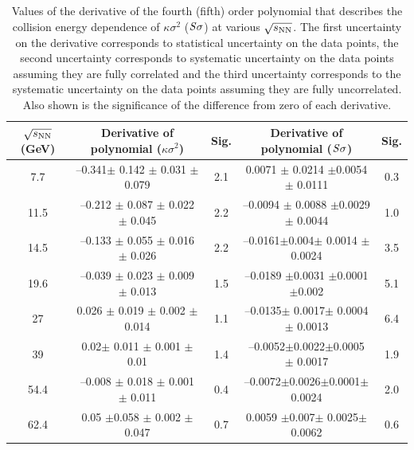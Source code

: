 \documentclass[10pt,aps,prc,twocolumn,floatfix]{revtex4-1}
\newcommand{\rootsnn} {\mbox{$\sqrt{s_{\rm NN}}$}\xspace}
\begin{document}
{\begin{table}
  \caption{Values of the derivative of the fourth (fifth) order polynomial that describes the collision energy dependence of $\kappa\sigma^{2}$
($\it{S}\sigma$) at various \rootsnn. The first uncertainty on the 
derivative corresponds to statistical uncertainty on the data
points, the second uncertainty corresponds to systematic uncertainty on the data points assuming
they are fully correlated and the third uncertainty corresponds to the systematic uncertainty on the
data points assuming they are fully uncorrelated. Also shown is the significance of the difference from zero of each derivative.}
	\centering   
	\begin{tabular}{|c|c|c|c|c|}
		\hline	
		\rootsnn (GeV) & Derivative of polynomial ($\kappa\sigma^{2}$)&Sig.  & Derivative of polynomial ($\it{S}\sigma$)&Sig.  \\
		\hline 
		7.7 & --0.341$\pm$ 0.142 $\pm$ 0.031 $\pm$ 0.079  &2.1 &0.0071 $\pm$ 0.0214 $\pm$0.0054 $\pm$ 0.0111& 0.3\\
		\hline 
		11.5 & --0.212 $\pm$ 0.087 $\pm$ 0.022 $\pm$ 0.045 &2.2& --0.0094 $\pm$ 0.0088 $\pm$0.0029 $\pm$ 0.0044&1.0 \\
		\hline 
		14.5 & --0.133 $\pm$ 0.055 $\pm$ 0.016 $\pm$ 0.026 &2.2&--0.0161$\pm$0.004$\pm$  0.0014 $\pm$ 0.0024&3.5 \\
		\hline 
		19.6 & --0.039 $\pm$ 0.023 $\pm$ 0.009 $\pm$ 0.013 & 1.5&--0.0189 $\pm$0.0031  $\pm$0.0001 $\pm$0.002& 5.1\\
		\hline 
		27 & 0.026 $\pm$ 0.019 $\pm$ 0.002 $\pm$ 0.014 & 1.1&--0.0135$\pm$ 0.0017$\pm$ 0.0004 $\pm$ 0.0013& 6.4\\
		\hline 
		39 & 0.02$\pm$ 0.011 $\pm$ 0.001 $\pm$ 0.01 & 1.4&--0.0052$\pm$0.0022$\pm$0.0005 $\pm$ 0.0017& 1.9\\
		\hline 
		54.4 & --0.008 $\pm$ 0.018 $\pm$ 0.001 $\pm$ 0.011 & 0.4&--0.0072$\pm$0.0026$\pm$0.0001$\pm$ 0.0024&2.0 \\
		\hline 
		62.4 & 0.05 $\pm$0.058 $\pm$ 0.002  $\pm$ 0.047 &0.7 &0.0059 $\pm$0.007$\pm$ 0.0025$\pm$ 0.0062& 0.6\\
		\hline 
	\end{tabular}
	\label{tab2}
      \end{table}
      
}
\end{document}
